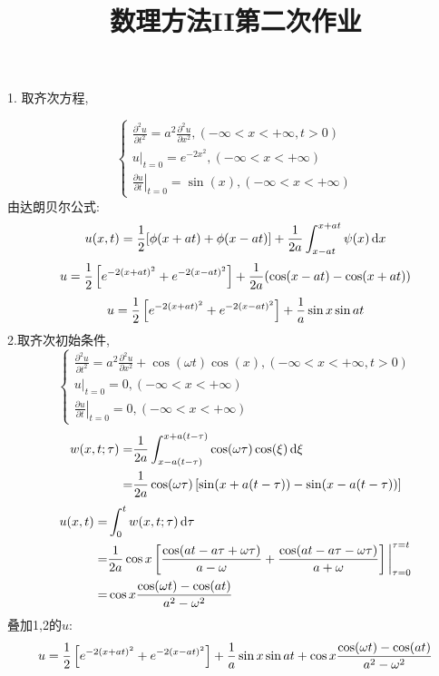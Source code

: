 \documentclass[UTF8,9pt]{ctexart}
\title{数理方法II第二次作业}
\begin{document}
 
\maketitle
{}
1. 取齐次方程, 

$$ 
\left\{\begin{array}{c}{\frac{\partial^{2} u}{\partial t^{2}}=a^{2} \frac{\partial^{2} u}{\partial x^{2}},(-\infty<x<+\infty, t>0)} \\ {\left.u\right|_{t=0}=e^{-2 x^{2}},(-\infty<x<+\infty)} \\ {\left.\frac{\partial u}{\partial t}\right|_{t=0}=\sin (x),(-\infty<x<+\infty)}\end{array}\right.
 $$
由达朗贝尔公式:
$$ 
u(x,t)=\frac{1}{2}[\phi(x+a t)+\phi(x-a t)]+\frac{1}{2 a} \int_{x-a t}^{x+a t} \psi(x) \mathop{}\!\mathrm{d} x
 $$
$$u=\frac{1}{2}\left[e^{-2(x+at)^2}+e^{-2(x-at)^2}\right]+\frac{1}{2a}(\cos(x-at)-\cos(x+at))$$
$$u=\frac{1}{2}\left[e^{-2(x+at)^2}+e^{-2(x-at)^2}\right]+\frac{1}{a}\sin x\sin at$$
2.取齐次初始条件, 
$$ 
\left\{\begin{array}{l}{\frac{\partial^{2} u}{\partial t^{2}}=a^{2} \frac{\partial^{2} u}{\partial x^{2}}+\cos (\omega t) \cos (x),(-\infty<x<+\infty, t>0)} \\ {\left.u\right|_{t=0}=0,(-\infty<x<+\infty)} \\ {\left.\frac{\partial u}{\partial t}\right|_{t=0}=0,(-\infty<x<+\infty)}\end{array}\right.
 $$
 $$ \begin{aligned} 
 w(x, t ; \tau) =&\displaystyle \frac{1}{2 a} \int_{x-a(t-\tau)}^{x+a(t-\tau)} \cos (\omega \tau) \cos (\xi) \mathop{}\!\mathrm{d} \xi\\
 =& \displaystyle \frac{1}{2a}\cos(\omega \tau)\left[ \sin(x+a(t-\tau)) - \sin(x-a(t-\tau)) \right]
  \end{aligned}
  $$
  $$ \begin{aligned} 
  u(x, t) =& \int_{0}^{t} w(x, t ; \tau) \mathop{}\!\mathrm{d} \tau\\
   =& \frac{1}{2a}\cos x\left[ \frac{\cos(at-a\tau+\omega\tau)}{a-\omega}+\frac{\cos(at-a\tau-\omega\tau)}{a+\omega}\right]\bigg|_{\tau=0}^{\tau=t}\\
   =& \cos x\frac{\cos(\omega t)-\cos (at)}{a^2-\omega^2}
   \end{aligned}$$
叠加1,2的$u$: 
$$u=\frac{1}{2}\left[e^{-2(x+at)^2}+e^{-2(x-at)^2}\right]+\frac{1}{a}\sin x\sin at+\cos x\frac{\cos(\omega t)-\cos (at)}{a^2-\omega^2}$$
\end{document}
